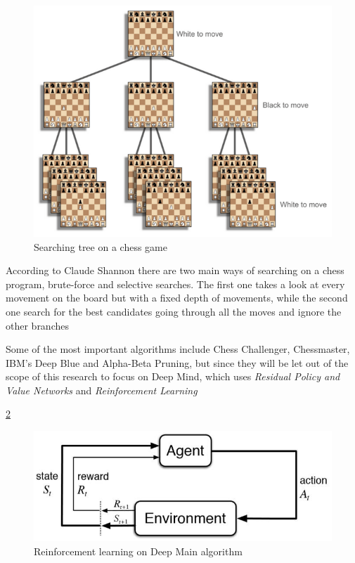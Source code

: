\documentclass[conference]{IEEEtran}
\begin{document}
\begin{figure}[h]
\includegraphics[scale=0.52]{img/tree}
\caption{Searching tree on a chess game \cite{how}}
\label{chess:tree}
\end{figure}

According to Claude Shannon there are two main ways of searching on a chess program, brute-force and selective searches. The first one takes a look at every movement on the board but with a fixed depth of movements, while the second one search for the best candidates going through all the moves and ignore the other branches \cite{how}

Some of the most important algorithms include Chess Challenger, Chessmaster, IBM’s Deep Blue and Alpha-Beta Pruning, but since they will be let out of the scope of this research to focus on Deep Mind, which uses \textit{Residual Policy and Value Networks} and \textit{Reinforcement Learning}


\ref{chess:reinforcement}

\begin{figure}[h]
\includegraphics[scale=0.52]{img/deepchess}
\caption{Reinforcement learning on Deep Main algorithm \cite{how}}
\label{chess:reinforcement}
\end{figure}
\end{document}
